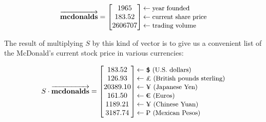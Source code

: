 \vspace{-.3in} 
\begin{align*}
\overrightarrow{\textbf{mcdonalds}} =
\begin{bmatrix}
1965 \\ 183.52 \\ 2606707 \\
\end{bmatrix}
\begin{matrix*}[l]
\leftarrow\textrm{\small{year founded}} \\
\leftarrow\textrm{\small{current share price}} \\
\leftarrow\textrm{\small{trading volume}} \\
\end{matrix*}
\end{align*}
\vspace{-.15in}

The result of multiplying $S$ by this kind of vector is to give us a
convenient list of the McDonald's current stock price in various currencies:

\vspace{-.3in} 
\begin{align*}
S \cdot \overrightarrow{\textbf{mcdonalds}} =
\begin{bmatrix}
183.52 \\ 126.93 \\ 20389.10 \\ 161.50 \\ 1189.21 \\ 3187.74 \\
\end{bmatrix}
\begin{matrix*}[l]
\leftarrow\textrm{\small{\EyesDollar \ (U.S. dollars)}} \\
\leftarrow\textrm{\small{\pounds \ (British pounds sterling)}} \\
\leftarrow\textrm{\small{\textyen \ (Japanese Yen)}} \\
\leftarrow\textrm{\small{\EURtm \ (Euros)}} \\
\leftarrow\textrm{\small{\textyen \ (Chinese Yuan)}} \\
\leftarrow\textrm{\small{\textpeso \ (Mexican Pesos)}} \\
\end{matrix*}
\end{align*}
\vspace{-.15in}

